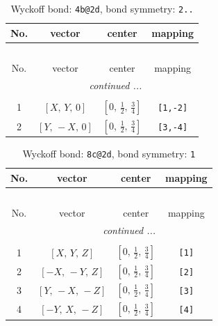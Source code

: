 \documentclass[fleqn,8pt]{jsarticle}
\begin{document}
\renewcommand{\arraystretch}{1.2}
\begin{longtable}{cccc}
\caption{Wyckoff bond: {\tt 4b@2d}, bond symmetry: {\tt 2..}}
 \\
 \hline \hline
No. & vector & center & mapping \\ \hline \endfirsthead

\multicolumn{3}{l}{\tablename\ \thetable{}} \\
 \hline \hline
No. & vector & center & mapping \\ \hline \endhead

 \hline \hline
\multicolumn{3}{r}{\footnotesize\it continued ...} \\ \endfoot

 \hline \hline
\multicolumn{3}{r}{} \\ \endlastfoot

1 & $\left[ X,\, Y,\, 0 \right]$ & $\left[ 0,\, \frac{1}{2},\, \frac{3}{4} \right]$ & {\tt [1,-2]} \\ \hline
2 & $\left[ Y,\, - X,\, 0 \right]$ & $\left[ 0,\, \frac{1}{2},\, \frac{3}{4} \right]$ & {\tt [3,-4]} \\
\end{longtable}
\renewcommand{\arraystretch}{1.2}
\begin{longtable}{cccc}
\caption{Wyckoff bond: {\tt 8c@2d}, bond symmetry: {\tt 1}}
 \\
 \hline \hline
No. & vector & center & mapping \\ \hline \endfirsthead

\multicolumn{3}{l}{\tablename\ \thetable{}} \\
 \hline \hline
No. & vector & center & mapping \\ \hline \endhead

 \hline \hline
\multicolumn{3}{r}{\footnotesize\it continued ...} \\ \endfoot

 \hline \hline
\multicolumn{3}{r}{} \\ \endlastfoot

1 & $\left[ X,\, Y,\, Z \right]$ & $\left[ 0,\, \frac{1}{2},\, \frac{3}{4} \right]$ & {\tt [1]} \\ \hline
2 & $\left[ - X,\, - Y,\, Z \right]$ & $\left[ 0,\, \frac{1}{2},\, \frac{3}{4} \right]$ & {\tt [2]} \\ \hline
3 & $\left[ Y,\, - X,\, - Z \right]$ & $\left[ 0,\, \frac{1}{2},\, \frac{3}{4} \right]$ & {\tt [3]} \\ \hline
4 & $\left[ - Y,\, X,\, - Z \right]$ & $\left[ 0,\, \frac{1}{2},\, \frac{3}{4} \right]$ & {\tt [4]} \\
\end{longtable}
\end{document}

